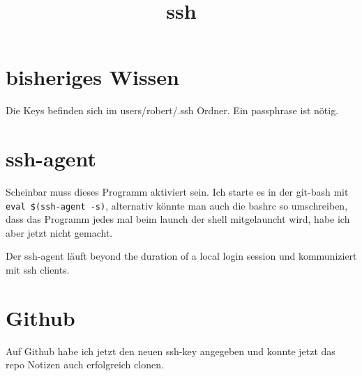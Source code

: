 \documentclass{article}
\begin{document}
\title{ssh}

\section*{bisheriges Wissen}
Die Keys befinden sich im users/robert/.ssh Ordner. Ein passphrase ist nötig.

\section*{ssh-agent}
Scheinbar muss dieses Programm aktiviert sein. Ich starte es in der git-bash mit \texttt{eval \$(ssh-agent -s)}, alternativ könnte man auch die bashrc so umschreiben, dass das Programm jedes mal beim launch der shell mitgelauncht wird, habe ich aber jetzt nicht gemacht.

Der ssh-agent läuft beyond the duration of a local login session und kommuniziert mit ssh clients.

\section*{Github}
Auf Github habe ich jetzt den neuen ssh-key angegeben und konnte jetzt das repo Notizen auch erfolgreich clonen.
\end{document}
